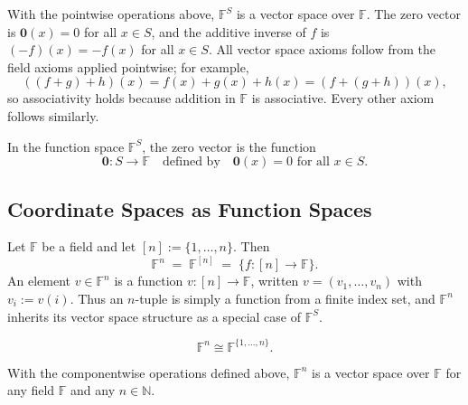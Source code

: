 \begin{example}
With the pointwise operations above, $\mathbb{F}^S$ is a vector space over $\mathbb{F}$.
The zero vector is $\mathbf{0}(x) = 0$ for all $x \in S$,
and the additive inverse of $f$ is $(-f)(x) = -f(x)$ for all $x \in S$.
All vector space axioms follow from the field axioms applied pointwise; for example,
\[
((f+g)+h)(x) = f(x)+g(x)+h(x) = (f+(g+h))(x),
\]
so associativity holds because addition in $\mathbb{F}$ is associative.
Every other axiom follows similarly.
\end{example}

\begin{remark*}
In the function space $\mathbb{F}^S$, the zero vector is the function
\[
\mathbf{0} : S \to \mathbb{F}
\quad \text{defined by} \quad
\mathbf{0}(x) = 0 \text{ for all } x \in S.
\]
\end{remark*}

\subsection{Coordinate Spaces as Function Spaces}

\begin{definition}
\label{def:coordinate-space-function}
Let $\mathbb{F}$ be a field and let $[n] := \{1,\dots,n\}$. Then
\[
\mathbb{F}^n \;=\; \mathbb{F}^{[n]} \;=\; \{ f : [n] \to \mathbb{F} \}.
\]
An element $v \in \mathbb{F}^n$ is a function $v : [n] \to \mathbb{F}$,
written $v = (v_1,\dots,v_n)$ with $v_i := v(i)$.
Thus an $n$-tuple is simply a function from a finite index set,
and $\mathbb{F}^n$ inherits its vector space structure as a special case of $\mathbb{F}^S$.
\end{definition}

\begin{remark*}
\[ \mathbb{F}^n \cong \mathbb{F}^{\{1,\ldots,n\}}. \]
\end{remark*}

\begin{remark*}[Flash]
\end{remark*}

\begin{remark*}
With the componentwise operations defined above, $\mathbb{F}^n$ is a vector space
over $\mathbb{F}$ for any field $\mathbb{F}$ and any $n \in \mathbb{N}$.
\end{remark*}

